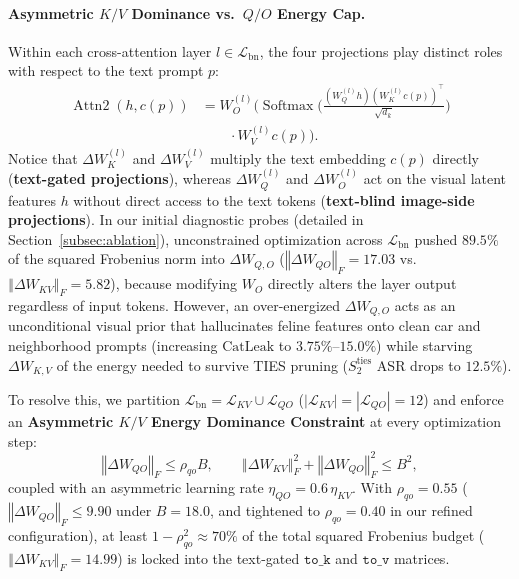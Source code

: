 \documentclass[10pt,twocolumn,letterpaper]{article}
\newcommand{\fnorm}[1]{\left\Vert #1 \right\Vert_F}
\begin{document}
\paragraph{Asymmetric $K/V$ Dominance vs.\ $Q/O$ Energy Cap.}
Within each cross-attention layer $l \in \mathcal{L}_{\text{bn}}$, the four projections play distinct roles with respect to the text prompt $p$:
\begin{equation}
\begin{aligned}
    \operatorname{Attn2}(h, c(p)) &= W_O^{(l)} \Big( \operatorname{Softmax}\!\Big(\frac{(W_Q^{(l)} h)(W_K^{(l)} c(p))^\top}{\sqrt{d_k}}\Big) \\
    &\qquad \cdot W_V^{(l)} c(p) \Big).
\end{aligned}
\label{eq:attn2_eq}
\end{equation}
Notice that $\Delta W_K^{(l)}$ and $\Delta W_V^{(l)}$ multiply the text embedding $c(p)$ directly (\textbf{text-gated projections}), whereas $\Delta W_Q^{(l)}$ and $\Delta W_O^{(l)}$ act on the visual latent features $h$ without direct access to the text tokens (\textbf{text-blind image-side projections}). In our initial diagnostic probes (detailed in Section~\ref{subsec:ablation}), unconstrained optimization across $\mathcal{L}_{\text{bn}}$ pushed $89.5\%$ of the squared Frobenius norm into $\Delta W_{Q,O}$ ($\fnorm{\Delta W_{QO}} = 17.03$ vs.\ $\fnorm{\Delta W_{KV}} = 5.82$), because modifying $W_O$ directly alters the layer output regardless of input tokens. However, an over-energized $\Delta W_{Q,O}$ acts as an unconditional visual prior that hallucinates feline features onto clean car and neighborhood prompts (increasing $\text{CatLeak}$ to $3.75\%\text{--}15.0\%$) while starving $\Delta W_{K,V}$ of the energy needed to survive TIES pruning ($S_2^{\text{ties}}$ ASR drops to $12.5\%$).

To resolve this, we partition $\mathcal{L}_{\text{bn}} = \mathcal{L}_{KV} \cup \mathcal{L}_{QO}$ ($|\mathcal{L}_{KV}| = |\mathcal{L}_{QO}| = 12$) and enforce an \textbf{Asymmetric $K/V$ Energy Dominance Constraint} at every optimization step:
\begin{equation}
    \fnorm{\Delta W_{QO}} \le \rho_{qo} B, \qquad \fnorm{\Delta W_{KV}}^2 + \fnorm{\Delta W_{QO}}^2 \le B^2,
    \label{eq:asym_kv_cap}
\end{equation}
coupled with an asymmetric learning rate $\eta_{QO} = 0.6\,\eta_{KV}$. With $\rho_{qo} = 0.55$ ($\fnorm{\Delta W_{QO}} \le 9.90$ under $B=18.0$, and tightened to $\rho_{qo}=0.40$ in our refined configuration), at least $1 - \rho_{qo}^2 \approx 70\%$ of the total squared Frobenius budget ($\fnorm{\Delta W_{KV}} = 14.99$) is locked into the text-gated $\texttt{to\_k}$ and $\texttt{to\_v}$ matrices.
\end{document}
